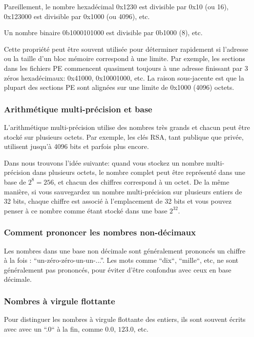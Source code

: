Pareillement, le nombre hexadécimal 0x1230 est divisible par 0x10 (ou 16),
0x123000 est divisible par 0x1000 (ou 4096), etc.

Un nombre binaire 0b1000101000 est divisible par 0b1000 (8), etc.

Cette propriété peut être souvent utilisée pour déterminer rapidement si l'adresse
ou la taille d'un bloc mémoire correspond à une limite.
Par exemple, les sections dans les fichiers \ac{PE} commencent quasiment toujours
à une adresse finissant par 3 zéros hexadécimaux: 0x41000, 0x10001000, etc. La raison
sous-jacente est que la plupart des sections \ac{PE} sont alignées sur une limite
de 0x1000 (4096) octets.

\subsubsection{Arithmétique multi-précision et base}

L'arithmétique multi-précision utilise des nombres très grands et chacun peut être
stocké sur plusieurs octets. Par exemple, les clés RSA, tant publique que privée,
utilisent jusqu'à 4096 bits et parfois plus encore.

Dans  nous trouvons l'idée suivante: quand vous
stockez un nombre multi-précision dans plusieurs octets, le nombre complet peut être
représenté dans une base de $2^8=256$, et chacun des chiffres correspond à un octet.
De la même manière, si vous sauvegardez un nombre multi-précision sur plusieurs
entiers de 32 bits, chaque chiffre est associé à l'emplacement de 32 bits et vous
pouvez penser à ce nombre comme étant stocké dans une base $2^{32}$.

\subsubsection{Comment prononcer les nombres non-décimaux}

Les nombres dans une base non décimale sont généralement prononcés un chiffre à
la fois : ``un-zéro-zéro-un-un-...''. Les mots comme ``dix``, ``mille``, etc, ne
sont généralement pas prononcés, pour éviter d'être confondus avec ceux en
base décimale.

\subsubsection{Nombres à virgule flottante}

Pour distinguer les nombres à virgule flottante des entiers, ils sont souvent écrits
avec avec un ``.0`` à la fin, comme $0.0$, $123.0$, etc.
